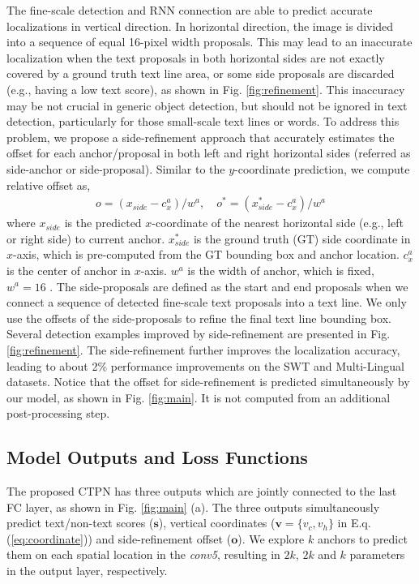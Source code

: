 \documentclass[runningheads]{llncs}
\begin{document}
The fine-scale detection and  RNN connection are able to predict accurate localizations in vertical direction. In horizontal direction, the image is divided into a sequence of equal 16-pixel width proposals. This  may lead to an inaccurate localization when the text proposals in both horizontal sides are not exactly covered by a ground truth text line area, or some side proposals are discarded (e.g., having a low text score), as shown in Fig. \ref{fig:refinement}. This inaccuracy may be not crucial in generic object detection, but should not be ignored in text detection, particularly for those small-scale text lines or words. To address this problem, we propose a side-refinement approach that accurately estimates the offset for each anchor/proposal in both left and right horizontal sides (referred as side-anchor or side-proposal).  Similar to the $y$-coordinate prediction, we compute relative offset as,
\begin{eqnarray}
o=(x_{side}-c_x^a)/w^a, \quad o^*=(x^*_{side}-c_x^a)/w^a 
\end{eqnarray}\label{eq:offset}
where $x_{side}$ is the predicted $x$-coordinate of the nearest horizontal side (e.g., left or right side) to current anchor. $x^*_{side}$ is the ground truth (GT) side coordinate in $x$-axis, which is pre-computed from the GT bounding box and anchor location. $c_x^a$ is the center of anchor in $x$-axis. $w^a$ is the width of anchor, which is fixed, $w^a=16$ . The side-proposals are defined as the start and end proposals when we connect a sequence of detected fine-scale text proposals into a text line. We only use the offsets of the side-proposals to refine the final text line bounding box. Several detection examples improved by side-refinement are presented in Fig. \ref{fig:refinement}. The side-refinement further improves the localization accuracy, leading to about 2\% performance improvements on the SWT and Multi-Lingual datasets. Notice that the offset for side-refinement is predicted simultaneously by our model, as shown in Fig. \ref{fig:main}. It is not computed from an additional post-processing step.

\subsection{Model Outputs and Loss Functions}
The proposed CTPN has three outputs which are jointly connected to the last FC layer, as shown in Fig. \ref{fig:main} (a). The three outputs simultaneously predict text/non-text scores ($\textbf{s}$),   vertical coordinates ($\textbf{v}=\{v_c, v_h\}$ in E.q. (\ref{eq:coordinate})) and side-refinement offset ($\textbf{o}$).
We explore $k$ anchors to predict them on each spatial location in the \textit{conv5},  resulting in $2k$, $2k$ and $k$ parameters in the output layer, respectively.
\end{document}
